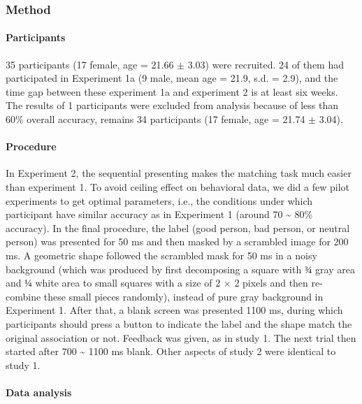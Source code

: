 \documentclass[
  english,
  man]{apa6}
\let\oldparagraph\paragraph
\renewcommand{\paragraph}[1]{\oldparagraph{#1}\mbox{}}
\begin{document}
\hypertarget{method-2}{%
\subsubsection{Method}\label{method-2}}

\hypertarget{participants-3}{%
\paragraph{Participants}\label{participants-3}}

35 participants (17 female, age = 21.66 \(\pm\) 3.03) were recruited. 24 of them had participated in Experiment 1a (9 male, mean age = 21.9, s.d. = 2.9), and the time gap between these experiment 1a and experiment 2 is at least six weeks. The results of 1 participants were excluded from analysis because of less than 60\% overall accuracy, remains 34 participants (17 female, age = 21.74 \(\pm\) 3.04).

\hypertarget{procedure-3}{%
\paragraph{Procedure}\label{procedure-3}}

In Experiment 2, the sequential presenting makes the matching task much easier than experiment 1. To avoid ceiling effect on behavioral data, we did a few pilot experiments to get optimal parameters, i.e., the conditions under which participant have similar accuracy as in Experiment 1 (around 70 \textasciitilde{} 80\% accuracy).
In the final procedure, the label (good person, bad person, or neutral person) was presented for 50 ms and then masked by a scrambled image for 200 ms. A geometric shape followed the scrambled mask for 50 ms in a noisy background (which was produced by first decomposing a square with \(¾\) gray area and \(¼\) white area to small squares with a size of 2 × 2 pixels and then re-combine these small pieces randomly), instead of pure gray background in Experiment 1. After that, a blank screen was presented 1100 ms, during which participants should press a button to indicate the label and the shape match the original association or not. Feedback was given, as in study 1. The next trial then started after 700 \textasciitilde{} 1100 ms blank. Other aspects of study 2 were identical to study 1.

\hypertarget{data-analysis-4}{%
\paragraph{Data analysis}\label{data-analysis-4}}
\end{document}
